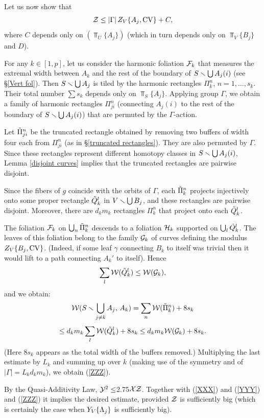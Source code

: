 \begin{pf}
\msk Let us now show that
\begin{equation}\label{ZZZ}
   {\cal Z} \leq { |\Gamma|\,  Z_V\{A_j, \mathrm{CV}\}}+C,
\end{equation}
where $C$ depends only on $(\Top_U\{A_j\})$ (which in turn depends only on $\Top_V\{B_j\}$ and $D$). 

For any $k\in [1,p]$, let us consider the harmonic foliation ${\cal F}_k$ that measures the extremal
width between $A_k$ and the rest of the boundary of $S\smallsetminus \bigcup A_j(i)$ (see \S \ref{Vert fol}).
Then $S\smallsetminus \bigcup A_j$ is tiled by the harmonic rectangles $\Pi^n_k$, $n=1,\dots, s_k$. 
Their total  number $\sum s_k$ depends only on $\Top_S\{A_j\}$.  
Applying group $\Gamma$, we obtain a family of harmonic  rectangles
$\Pi^n_{ji}$ (connecting $A_j(i)$ to the rest of the boundary of $S\smallsetminus \bigcup A_j(i)$)
that are permuted by the $\Gamma$-action.

Let $\tilde \Pi^n_{ji}$ be the truncated rectangle obtained
by removing two buffers of width four each
from $\Pi^n_{ji}$ (as in \S \ref{truncated rectangles}).
They are also permuted by $\Gamma$.
Since these rectangles represent different homotopy classes in $S\smallsetminus \bigcup A_j(i)$,
Lemma \ref{disjoint curves} implies that
the truncated rectangles are pairwise disjoint.

Since the fibers of $g$ coincide with the orbits of $\Gamma$,
each $\tilde \Pi_k^n$ projects injectively onto some proper rectangle $\tilde Q_k^l$ in $V\smallsetminus \bigcup B_j$,
and these rectangles are pairwise disjoint. Moreover, there are $d_k m_k$ rectangles $\Pi_k^n$
that project onto each $\tilde Q_k^l$. 

The foliation ${\cal F}_k$ on $\bigcup_n \tilde\Pi^n_k$ descends to a foliation
${\cal H}_k$ supported on $\bigcup_l \tilde Q^l_k$. The leaves of this foliation belong to the 
family ${\cal G}_k$ of curves defining the modulus $Z_V\{B_j, \mathrm{CV}\}$. 
(Indeed, if some leaf $\gamma$ connecting $B_k$  to itself was trivial then
it would lift to a path connecting  $A_k'$ to itself). Hence
$$
     \sum_l {\cal W}(\tilde Q^l_k) \leq {\cal W}({\cal G}_k),
$$    
  and we obtain:
$$
     {\cal W}(S\smallsetminus \bigcup_{j\not=k}A_j, \, A_k) =\sum_n {\cal W}(\tilde \Pi^n_k) + 8 s_k 
$$
$$
\leq d_k m_k\sum_l {\cal W}(\tilde Q^l_k) + 8 s_k \leq  d_k m_k {\cal W}({\cal G}_k)  + 8 s_k .
$$
(Here $8 s_k$ appears as the total width of the buffers removed.)
Multiplying  the last estimate by $L_k$ and summing  up over $k$
(making use of the symmetry and of $|\Gamma|=L_k d_k m_k$), 
we obtain (\ref{ZZZ}).

\msk
By the Quasi-Additivity Law, ${\cal Y}^2\leq $2.75$ {\cal X} {\cal Z}$.
Together with (\ref{XXX}) and (\ref{YYY}) and (\ref{ZZZ}) it implies the desired estimate,
provided ${\cal Z}$ is sufficiently big (which is certainly the case when $Y_V\{{\Lambda}_j\}$ is 
sufficiently big).
\end{pf}


